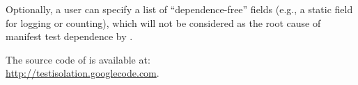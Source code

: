 Optionally, a user can specify a
list of ``dependence-free''
fields (e.g., a static field for
logging or counting), which will not be considered
as the root cause of manifest test
dependence by \ourtool.












The source code of \ourtool is available at:\\ \url{http://testisolation.googlecode.com}.




